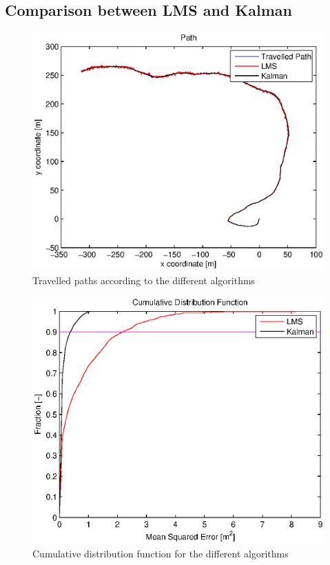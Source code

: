 \documentclass[a4paper]{article}        %
\begin{document}
\subsection{Comparison between LMS and Kalman}
	
			\begin{figure}[H]
				\centering
				\includegraphics[width=\textwidth]{images/tracking_algorithms.eps}
				\caption{Travelled paths according to the different algorithms}
				\label{fig:paths}
			\end{figure}
			
						\begin{figure}[H]
				\centering
				\includegraphics[width=\textwidth]{images/cdf_algorithms.eps}
				\caption{Cumulative distribution function for the different algorithms}
				\label{fig:cdf}
			\end{figure}
\end{document}
